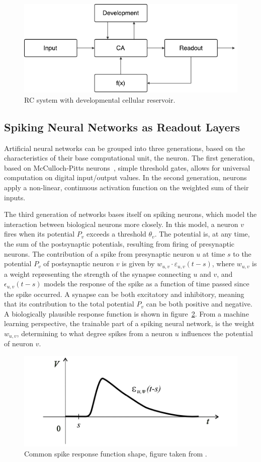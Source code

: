 \begin{figure}[ht]
  \centering
  \includegraphics[width=0.6\linewidth]{fig/rc-dev-ca}
  \caption{RC system with developmental cellular reservoir.}
  \label{fig:rc-dev-ca}
\end{figure}

\subsection{Spiking Neural Networks as Readout Layers}

Artificial neural networks can be grouped into three generations, based on the
characteristics of their base computational unit, the neuron. The first
generation, based on McCulloch-Pitts neurons~\cite{McCulloch1943}, simple
threshold gates, allows for universal computation on digital input/output
values. In the second generation, neurons apply a non-linear, continuous
activation function on the weighted sum of their inputs.

The third generation of networks bases itself on spiking neurons, which model
the interaction between biological neurons more closely. In this model, a neuron
$v$ fires when its potential $P_v$ exceeds a threshold $\theta_v$. The potential
is, at any time, the sum of the postsynaptic potentials, resulting from firing
of presynaptic neurons. The contribution of a spike from presynaptic neuron $u$
at time $s$ to the potential $P_v$ of postsynaptic neuron $v$ is given by
$w_{u,v} \cdot \varepsilon_{u,v}(t-s)$, where $w_{u,v}$ is a weight representing
the strength of the synapse connecting $u$ and $v$, and $\epsilon_{u,v}(t-s)$
models the response of the spike as a function of time passed since the spike
occurred. A synapse can be both excitatory and inhibitory, meaning that its
contribution to the total potential $P_v$ can be both positive and negative. A
biologically plausible response function is shown in
figure~\ref{fig:response-function-snn}. From a machine learning perspective, the
trainable part of a spiking neural network, is the weight $w_{u,v}$, determining
to what degree spikes from a neuron $u$ influences the potential of neuron $v$.

\begin{figure}[ht]
  \centering
  \includegraphics[width=0.5\linewidth]{fig/response-function-snn}
  \caption{Common spike response function shape, figure taken from \cite{Maass1997}.}
  \label{fig:response-function-snn}
\end{figure}


